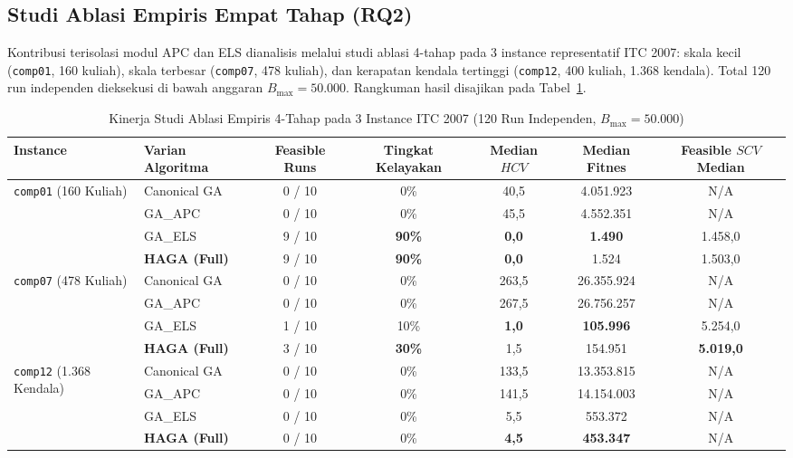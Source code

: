 \documentclass[journal]{IEEEtran}
\begin{document}
\subsection{Studi Ablasi Empiris Empat Tahap (RQ2)}
Kontribusi terisolasi modul APC dan ELS dianalisis melalui studi ablasi 4-tahap pada 3 instance representatif ITC 2007: skala kecil (\texttt{comp01}, 160 kuliah), skala terbesar (\texttt{comp07}, 478 kuliah), dan kerapatan kendala tertinggi (\texttt{comp12}, 400 kuliah, 1.368 kendala). Total 120 run independen dieksekusi di bawah anggaran $B_{\max} = 50.000$. Rangkuman hasil disajikan pada Tabel~\ref{tab:ablation}.

\begin{table}[!t]
\caption{Kinerja Studi Ablasi Empiris 4-Tahap pada 3 Instance ITC 2007 (120 Run Independen, $B_{\max} = 50.000$)}
\label{tab:ablation}
\centering
\small
\begin{tabular}{ll c c c c c}
\toprule
\textbf{Instance} & \textbf{Varian Algoritma} & \textbf{Feasible Runs} & \textbf{Tingkat Kelayakan} & \textbf{Median $HCV$} & \textbf{Median Fitnes} & \textbf{Feasible $SCV$ Median} \\
\midrule
\multirow{4}{*}{\texttt{comp01} (160 Kuliah)} 
& Canonical GA & 0 / 10 & 0\% & 40,5 & 4.051.923 & N/A \\
& GA\_APC      & 0 / 10 & 0\% & 45,5 & 4.552.351 & N/A \\
& GA\_ELS      & 9 / 10 & \textbf{90\%} & \textbf{0,0} & \textbf{1.490} & 1.458,0 \\
& \textbf{HAGA (Full)}& 9 / 10 & \textbf{90\%} & \textbf{0,0} & 1.524 & 1.503,0 \\
\midrule
\multirow{4}{*}{\texttt{comp07} (478 Kuliah)} 
& Canonical GA & 0 / 10 & 0\% & 263,5 & 26.355.924 & N/A \\
& GA\_APC      & 0 / 10 & 0\% & 267,5 & 26.756.257 & N/A \\
& GA\_ELS      & 1 / 10 & 10\% & \textbf{1,0} & \textbf{105.996} & 5.254,0 \\
& \textbf{HAGA (Full)}& 3 / 10 & \textbf{30\%} & 1,5 & 154.951 & \textbf{5.019,0} \\
\midrule
\multirow{4}{*}{\texttt{comp12} (1.368 Kendala)} 
& Canonical GA & 0 / 10 & 0\% & 133,5 & 13.353.815 & N/A \\
& GA\_APC      & 0 / 10 & 0\% & 141,5 & 14.154.003 & N/A \\
& GA\_ELS      & 0 / 10 & 0\% & 5,5 & 553.372 & N/A \\
& \textbf{HAGA (Full)}& 0 / 10 & 0\% & \textbf{4,5} & \textbf{453.347} & N/A \\
\bottomrule
\end{tabular}
\end{table}
\end{document}
